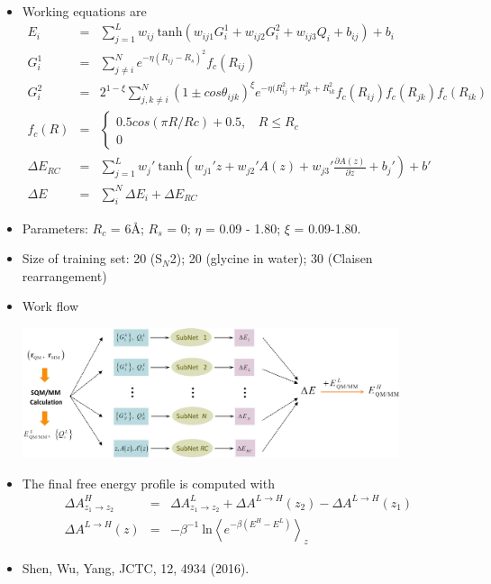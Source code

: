 \documentclass[handout]{beamer} %
\begin{document}
\begin{frame}
\begin{itemize}
\item \scriptsize{Working equations are}
\begin{eqnarray}
E_i & = & \sum_{j=1}^L w_{ij} ~\mathrm{tanh} \left(  w_{ij1} G_i^1 + w_{ij2} G_i^2  + w_{ij3} Q_i  + b_{ij} \right) + b_i  \\
G_i^1 & = & \sum_{j \neq i} ^{N} e^{-\eta ( R_{ij} - R_s ) ^2 } f_c ( R_{ij} ) \\
G_i^2 & = & 2 ^ { 1-\xi} \sum_{j, k \neq i}  ^ N ( 1 \pm cos \theta_{ijk} ) ^ \xi e ^ { - \eta ( R_{ij}^2 + R_{jk}^2 + R_{ik}^2 }  f_c  ( R_{ij} )  f_c  ( R_{jk} )  f_c  ( R_{ik} )   \\
f_c (R) &  = &  \left\{ \begin{array}{l}  0.5 cos \left( \pi R / Rc \right) + 0.5,~~~~ R \leq R_c \\ 0  \end{array} \right.   \\
\Delta E_{RC} & = & \sum_{j=1}^L w_{j}'~\mathrm{tanh} \left(  w_{j1}' z + w_{j2}' A(z)  + w_{j3}'  \frac{\partial A(z)}{\partial z}   + b_{j}' \right) + b' \\  
\Delta E & = & \sum_i^N \Delta E_i + \Delta E_{RC} 
\end{eqnarray}
\item Parameters: $R_c$ = 6\AA; $R_s$ = 0; $\eta$ = 0.09 - 1.80; $\xi$ = 0.09-1.80. 
\item Size of training set: 20 (S$_N$2); 20 (glycine in water); 30 (Claisen rearrangement)
\end{itemize}

\end{frame}

\begin{frame}
\begin{itemize}
\item Work flow
\begin{center}
\includegraphics[height=1.5in]{figures_ml/weitao_1.png}
\end{center}
\item \footnotesize{The final free energy profile is computed with}
\begin{eqnarray}
\Delta A^H_{z_1 \rightarrow z_2} & = &  \Delta A^L_{z_1 \rightarrow z_2}  + \Delta A^{L \rightarrow H} (z_2) -  \Delta A^{L \rightarrow H} (z_1) \\
\Delta A^{L \rightarrow H} (z) & = & - \beta^{-1} ~\mathrm{ln} \left< e^{ - \beta (E^H - E^L) } \right>_z 
\end{eqnarray}
\item Shen, Wu, Yang, JCTC, 12, 4934 (2016). 
\end{itemize}
\end{frame}
\end{document}
